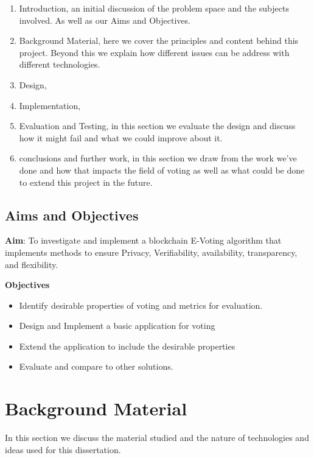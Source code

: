 \documentclass{entcs}
\begin{document}
\begin{enumerate}
    \item Introduction, an initial discussion of the problem space and the subjects involved. As well as our Aims and Objectives.
    \item Background Material, here we cover the principles and content behind this project. Beyond this we explain how different issues can be address with different technologies.
    \item Design,
    \item Implementation,
    \item Evaluation and Testing, in this section we evaluate the design and discuss how it might fail and what we could improve about it.
    \item conclusions and further work, in this section we draw from the work we've done and how that impacts the field of voting as well as what could be done to extend this project in the future.
\end{enumerate}

\subsection{Aims and Objectives}
\begin{center}
    {\bf Aim}: To investigate and implement a blockchain E-Voting algorithm that implements methods to ensure Privacy, Verifiability, availability, transparency, and flexibility. 
\end{center}
{\bf Objectives}
\begin{itemize}
    \item Identify desirable properties of voting and metrics for evaluation.
    \item Design and Implement a basic application for voting
    \item Extend the application to include the desirable properties
    \item Evaluate and compare to other solutions.
\end{itemize}

\section{Background Material}
In this section we discuss the material studied and the nature of technologies and ideas used for this dissertation.
\end{document}
